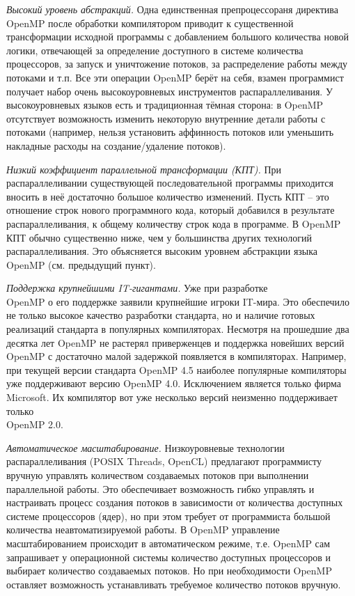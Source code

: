 {	\par\textit{Высокий уровень абстракций.} Одна единственная препроцессораня директива OpenMP после обработки компилятором приводит к существенной трансформации исходной программы с добавлением большого количества новой логики, отвечающей за определение доступного в системе количества процессоров, за запуск и уничтожение потоков, за распределение работы между потоками и т.п. Все эти операции OpenMP берёт на себя,  взамен программист получает набор очень высокоуровневых инструментов распараллеливания. У высокоуровневых языков есть и традиционная тёмная сторона: в OpenMP отсутствует возможность изменить некоторую внутренние детали работы с потоками (например, нельзя установить аффинность  потоков или уменьшить накладные расходы на создание/удаление потоков).
	\par\textit{Низкий коэффициент параллельной трансформации (КПТ).} При распараллеливании существующей последовательной программы приходится вносить в неё достаточно большое количество изменений. Пусть КПТ – это отношение строк нового программного кода, который добавился в результате распараллеливания, к общему количеству строк кода в программе. В OpenMP КПТ обычно существенно ниже, чем у большинства других технологий распараллеливания. Это объясняется высоким уровнем абстракции языка OpenMP (см. предыдущий пункт). 
	\par\textit{Поддержка крупнейшими  IT-гигантами.} Уже при разработке\\ OpenMP о его поддержке заявили крупнейшие игроки IT-мира. Это обеспечило не только высокое качество разработки стандарта, но и наличие готовых реализаций стандарта в популярных компиляторах. Несмотря на прошедшие два десятка лет OpenMP не растерял приверженцев и поддержка новейших версий OpenMP с достаточно малой задержкой появляется в компиляторах. Например, при текущей версии стандарта OpenMP 4.5 наиболее популярные компиляторы уже поддерживают версию OpenMP 4.0. Исключением является только фирма Microsoft. Их компилятор вот уже несколько версий неизменно поддерживает только \\OpenMP 2.0. 
	\par\textit{Автоматическое масштабирование.}  Низкоуровневые технологии распараллеливания (POSIX Threads, OpenCL) предлагают программисту вручную управлять количеством создаваемых потоков при выполнении параллельной работы. Это обеспечивает возможность гибко управлять и настраивать процесс создания потоков в зависимости от количества доступных системе процессоров (ядер), но при этом требует от программиста большой количества неавтоматизируемой работы. В OpenMP управление масштабированием происходит в автоматическом режиме, т.е. OpenMP сам запрашивает у операционной системы количество доступных процессоров и выбирает количество создаваемых потоков. Но при необходимости OpenMP оставляет возможность устанавливать требуемое количество потоков вручную.
}
